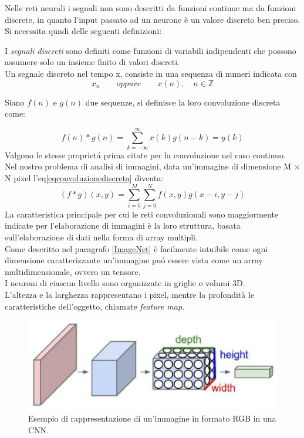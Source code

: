 \documentclass[a4paper,12pt,oneside]{book}
\begin{document}
Nelle reti neurali i segnali non sono descritti da funzioni continue ma da funzioni discrete, in quanto l'input passato ad un neurone \`e un valore discreto ben preciso.\\
Si necessita qundi delle seguenti definizioni:
\begin{defin}
I \textit{segnali discreti} sono definiti come funzioni di variabili indipendenti che possono assumere solo un insieme finito di valori discreti.\\
Un segnale discreto nel tempo x, consiste in una sequenza di numeri indicata con 
$$x_n \qquad oppure \qquad x(n) ,\quad n\in \mathbb{Z}$$
\end{defin}
\begin{defin}
Siano $f(n)$ e $g(n)$ due sequenze, si definisce la loro convoluzione discreta come:
\end{defin}
\begin{equation} \label{eqconvoluzionediscreta}
f(n)*g(n)=\sum_{k=-\infty}^{\infty}x(k)g(n-k)=y(k)
\end{equation}
Valgono le stesse propriet\'{a} prima citate per la convoluzione nel caso continuo. Nel nostro problema di analisi di immagini, data un'immagine di dimensione M $\times$ N pixel l'eq\ref{eqconvoluzionediscreta} diventa:
\begin{equation}
(f*g)(x,y)=\sum_{i=0}^M \sum_{j=0}^N f(x,y)g(x-i,y-j)
\end{equation}
La caratteristica principale per cui le reti convoluzionali sono maggiormente indicate per l'elaborazione di immagini \`e la loro struttura, basata sull'elaborazione di dati nella forma di array multipli.\\
Come descritto nel paragrafo \ref{ImageNet} \`e facilmente intuibile come ogni dimensione caratterizzante un'immagine pu\'{o} essere vista come un array multidimensionale, ovvero un tensore.\\
I neuroni di ciascun livello sono organizzate in griglie o volumi 3D.\\
L'altezza e la larghezza rappresentano i pixel, mentre la profondit\`{a} le caratteristiche dell'oggetto, chiamate \textit{feature map}.
\begin{figure}[!h]
\centering
\includegraphics{Immagine3D}
\caption{Esempio di rappresentazione di un'immagine in formato RGB in una CNN.}
\end{figure}
\end{document}
